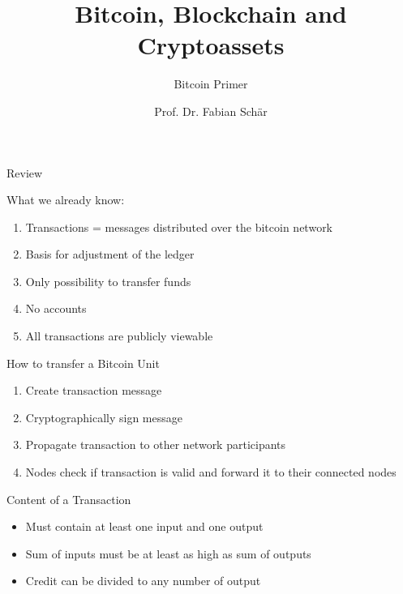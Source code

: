 \documentclass[]{beamer}
\title{Bitcoin, Blockchain and Cryptoassets}
\subtitle{Bitcoin Primer}
\author{Prof. Dr. Fabian Schär}
\institute{University of Basel}
\begin{document}
\thispagestyle{empty}
\begin{frame}[noframenumbering]
	\titlepage
\end{frame}


\begin{frame}{Review}

What we already know: \\ 
\vspace{1em}
	\begin{enumerate}
		\item<1->{Transactions = messages distributed over the bitcoin network}
		\item<2->{Basis for adjustment of the ledger}
		\item<3->{Only possibility to transfer funds}
		\item<4->{No accounts}
		\item<5->{All transactions are publicly viewable}
	\end{enumerate}
\end{frame}


\begin{frame}{How to transfer a Bitcoin Unit} %

\begin{enumerate}
		\item<1->{Create transaction message}
		\item<2->{Cryptographically sign message}
		\item<3->{Propagate transaction to other network participants}
		\item<4->{Nodes check if transaction is valid and forward it to their connected nodes}
	\end{enumerate}	
\end{frame}


\begin{frame}{Content of a Transaction}
\centering
\begin{figure}

\end{figure} 
\vspace{1em}
\begin{itemize}
  \item<2->{Must contain at least one input and one output}
  \item<3->{Sum of inputs must be at least as high as sum of outputs}
	\item<4->{Credit can be divided to any number of output}
\end{itemize}
\end{frame}	
\end{document}
